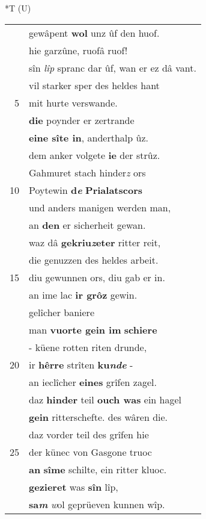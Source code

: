 \documentclass[8pt,a4paper,notitlepage]{article}
\begin{document}
\begin{table}[ht]
\hspace{0.5cm}
\begin{minipage}[t]{0.5\linewidth}
\small
\begin{center}*T (U)
\end{center}
\begin{tabular}{rl}
 & gewâpent \textbf{wol} unz ûf den huof.\\ 
 & hie garzûne, ruofâ ruof!\\ 
 & sîn \textit{lîp} spranc dar ûf, wan er ez dâ vant.\\ 
 & vil starker sper des heldes hant\\ 
5 & mit hurte verswande.\\ 
 & \textbf{die} poynder er zertrande\\ 
 & \textbf{eine sîte in}, anderthalp ûz.\\ 
 & dem anker volgete \textbf{ie} der strûz.\\ 
 & Gahmuret stach hinder\textit{z} ors\\ 
10 & Poytewin \textbf{d\textit{e}} \textbf{Prialatscors}\\ 
 & und anders manigen werden man,\\ 
 & an \textbf{den} er sicherheit gewan.\\ 
 & waz dâ \textbf{gekriu\textit{z}eter} ritter reit,\\ 
 & die genuzzen des heldes arbeit.\\ 
15 & diu gewunnen ors, diu gab er in.\\ 
 & an ime lac \textbf{ir grôz} gewin.\\ 
 & gelîcher baniere\\ 
 & man \textbf{vuorte gein im} \textbf{schiere}\\ 
 & - küene rotten riten drunde,\\ 
20 & ir \textbf{hêrre} strîten \textbf{ku\textit{nde}} -\\ 
 & an ieclîcher \textbf{eines} grîfen zagel.\\ 
 & daz \textbf{hinder} teil \textbf{ouch was} ein hagel\\ 
 & \textbf{gein} ritterschefte. des wâren die.\\ 
 & daz vorder teil des grîfen hie\\ 
25 & der künec von Gasgone truoc\\ 
 & \textbf{an} \textbf{sîme} schilte, ein ritter kluoc.\\ 
 & \textbf{gezieret} was \textbf{sîn} lîp,\\ 
 & \textbf{sa\textit{m}} \textit{w}ol geprüeven kunnen wîp.\\ 

\end{tabular}
\end{minipage}
\end{table}
\end{document}
